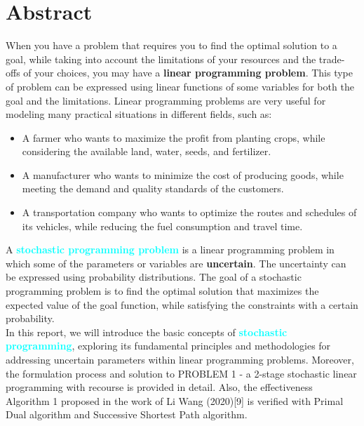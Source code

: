 \newpage
\section{Abstract}
\qquad When you have a problem that requires you to find the optimal solution to a goal, while taking into account the limitations of your resources and the trade-offs of your choices, you may have a \textbf{linear programming problem}. This type of problem can be expressed using linear functions of some variables for both the goal and the limitations. Linear programming problems are very useful for modeling many practical situations in different fields, such as:

\begin{itemize}
	\item A farmer who wants to maximize the profit from planting crops, while considering the available land, water, seeds, and fertilizer.
	\item A manufacturer who wants to minimize the cost of producing goods, while meeting the demand and quality standards of the customers.
	\item A transportation company who wants to optimize the routes and schedules of its vehicles, while reducing the fuel consumption and travel time.\\
\end{itemize}

\qquad A \textcolor{cyan}{\textbf{stochastic programming problem}} is a linear programming problem in which some of the parameters or variables are \textbf{uncertain}. The uncertainty can be expressed using probability distributions. The goal of a stochastic programming problem is to find the optimal solution that maximizes the expected value of the goal function, while satisfying the constraints with a certain probability.\\

\qquad In this report, we will introduce the basic concepts of \textcolor{cyan}{\textbf{stochastic programming}}, exploring its fundamental principles and methodologies for addressing uncertain parameters within linear programming problems. Moreover, the formulation process and solution to PROBLEM 1 - a 2-stage stochastic linear programming with recourse is provided in detail. Also, the effectiveness Algorithm 1 proposed in the work of Li Wang (2020)[9] is verified with Primal Dual algorithm and Successive Shortest Path algorithm.
